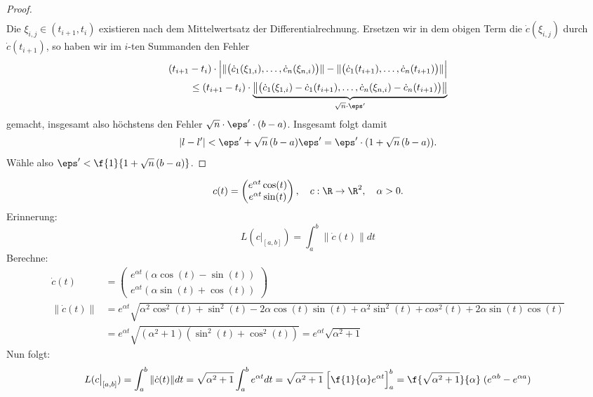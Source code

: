 \documentclass{mycourse}
\begin{document}
\begin{st}
\begin{proof}
\begin{align*}
\end{align*}
Die $\xi_{i,j} \in (t_{i+1},t_i)$ existieren nach dem Mittelwertsatz der Differentialrechnung. 
Ersetzen wir in dem obigen Term die $\dot c(\xi_{i,j})$ durch $\dot c(t_{i+1})$, so haben wir im $i$-ten Summanden den Fehler
\begin{align*}
 (t_{i+1} - t_i) \cdot \Big | \| \big( \dot c_1(\xi_{1,i}),  \dots  , \dot c_n(\xi_{n,i}) \big)\| - \| \big( \dot c_1(t_{i+1}),  \dots  , \dot c_n(t_{i+1}) \big)\| \Big| \\
\le (t_{i+1} - t_i) \cdot \underbrace{\big \| \big(   \dot c_1(\xi_{1,i}) - \dot c_1(t_{i+1}),  \dots  , \dot c_n(\xi_{n,i}) - \dot c_n(t_{i+1}) \big) \big \| }_{\sqrt{n} \cdot \eps'}
\end{align*}
gemacht, insgesamt also höchstens den Fehler $\sqrt{n} \cdot \eps' \cdot (b-a)$. Insgesamt folgt damit
\[ |l-l'| < \eps' + \sqrt{n} \, (b-a) \eps' = \eps' \cdot (1 + \sqrt{n} \,  (b-a)). \]
Wähle also  $\eps' < \f{1}{1+\sqrt{n} \, (b-a)}$.
\end{proof}
\end{st}

\begin{ex}
\[ c(t) = \begin{pmatrix} e^{\alpha t} \cos(t) \\ e^{\alpha t} \sin(t) \end{pmatrix} , \quad c: \R \to \R^2, \quad \alpha > 0. \]
Erinnerung: \[ L(c \big |_{[a,b]}) = \int_a^b \| \dot c(t) \| dt  \]
Berechne: 
\begin{align*}
 \dot c (t) &= \begin{pmatrix} e^{\alpha t} (\alpha \cos(t) - \sin(t)) \\ e^{\alpha t} (\alpha \sin(t) + \cos(t)) \end{pmatrix}  \\
  \| \dot c(t) \| &= e^{\alpha t} \sqrt{\alpha^2 \cos^2(t) + \sin^2(t) - 2 \alpha \cos(t) \sin(t) + \alpha^2 \sin^2(t) + cos^2(t) + 2 \alpha \sin(t) \cos(t)} \\
 &= e^{\alpha t} \sqrt{(\alpha^2 +  1) (\sin^2(t) + \cos^2(t) )} = e^{\alpha t} \sqrt{\alpha^2 + 1} 
\end{align*}
Nun folgt: 
\[
 L(c \big |_{[a,b]}) =  \int_a^b \| \dot c(t) \| dt  = \sqrt{\alpha^2 + 1}  \int_a^b  e^{\alpha t} dt  
 = \sqrt{\alpha^2 + 1} \; \Big [ \f{1}{\alpha} e^{\alpha t} \Big ]_a^b  = \f{\sqrt{\alpha^2 + 1}}{\alpha} \; (e^{\alpha b} - e^{\alpha a} ) 
\]

\end{ex}
\end{document}
